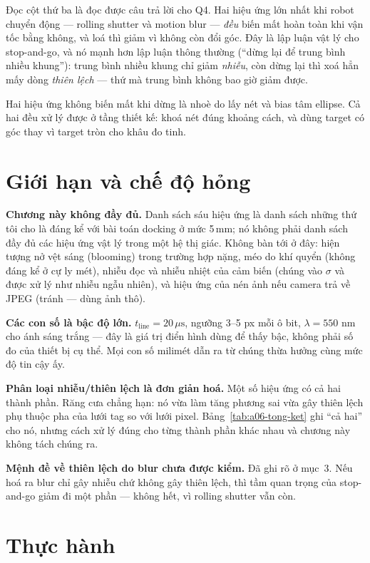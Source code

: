 \documentclass[../../marker.tex]{subfiles}
\begin{document}
Đọc cột thứ ba là đọc được câu trả lời cho Q4. Hai hiệu ứng lớn nhất khi robot chuyển động --- rolling shutter và motion blur --- \emph{đều} biến mất hoàn toàn khi vận tốc bằng không, và loá thì giảm vì không còn đổi góc. Đây là lập luận vật lý cho stop-and-go, và nó mạnh hơn lập luận thông thường (``dừng lại để trung bình nhiều khung''): trung bình nhiều khung chỉ giảm \emph{nhiễu}, còn dừng lại thì xoá hẳn mấy dòng \emph{thiên lệch} --- thứ mà trung bình không bao giờ giảm được.

Hai hiệu ứng không biến mất khi dừng là nhoè do lấy nét và bias tâm ellipse. Cả hai đều xử lý được ở tầng thiết kế: khoá nét đúng khoảng cách, và dùng target có góc thay vì target tròn cho khâu đo tinh.

\section{Giới hạn và chế độ hỏng}

\textbf{Chương này không đầy đủ.} Danh sách sáu hiệu ứng là danh sách những thứ tôi cho là đáng kể với bài toán docking ở mức 5\,mm; nó không phải danh sách đầy đủ các hiệu ứng vật lý trong một hệ thị giác. Không bàn tới ở đây: hiện tượng nở vệt sáng (blooming) trong trường hợp nặng, méo do khí quyển (không đáng kể ở cự ly mét), nhiễu đọc và nhiễu nhiệt của cảm biến (chúng vào \(\sigma\) và được xử lý như nhiễu ngẫu nhiên), và hiệu ứng của nén ảnh nếu camera trả về JPEG (tránh --- dùng ảnh thô).

\textbf{Các con số là bậc độ lớn.} \(t_{\text{line}} = 20\,\mu\text{s}\), ngưỡng 3--5 px mỗi ô bit, \(\lambda = 550\) nm cho ánh sáng trắng --- đây là giá trị điển hình dùng để thấy bậc, không phải số đo của thiết bị cụ thể. Mọi con số milimét dẫn ra từ chúng thừa hưởng cùng mức độ tin cậy ấy.

\textbf{Phân loại nhiễu/thiên lệch là đơn giản hoá.} Một số hiệu ứng có cả hai thành phần. Răng cưa chẳng hạn: nó vừa làm tăng phương sai vừa gây thiên lệch phụ thuộc pha của lưới tag so với lưới pixel. Bảng~\ref{tab:a06-tong-ket} ghi ``cả hai'' cho nó, nhưng cách xử lý đúng cho từng thành phần khác nhau và chương này không tách chúng ra.

\textbf{Mệnh đề về thiên lệch do blur chưa được kiểm.} Đã ghi rõ ở mục~3. Nếu hoá ra blur chỉ gây nhiễu chứ không gây thiên lệch, thì tầm quan trọng của stop-and-go giảm đi một phần --- không hết, vì rolling shutter vẫn còn.

\section{Thực hành}
\end{document}
